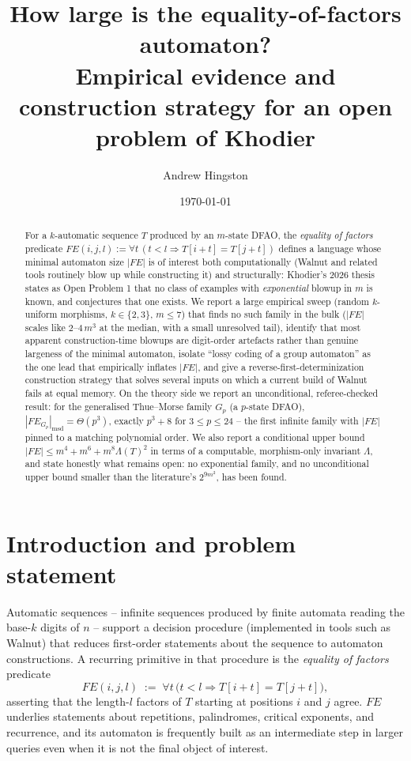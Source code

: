 \documentclass[11pt]{article}
\title{How large is the equality-of-factors automaton?\\
Empirical evidence and construction strategy for an open problem of Khodier}
\author{Andrew Hingston}
\date{\today}
\begin{document}
\maketitle

\begin{abstract}
For a $k$-automatic sequence $T$ produced by an $m$-state DFAO, the \emph{equality of
factors} predicate $FE(i,j,l) := \forall t\,(t<l \Rightarrow T[i+t]=T[j+t])$ defines a
language whose minimal automaton size $|FE|$ is of interest both computationally (Walnut
and related tools routinely blow up while constructing it) and structurally: Khodier's
2026 thesis states as Open Problem 1 that no class of examples with \emph{exponential}
blowup in $m$ is known, and conjectures that one exists. We report a large empirical
sweep (random $k$-uniform morphisms, $k\in\{2,3\}$, $m\le7$) that finds no such family in
the bulk ($|FE|$ scales like $2$--$4\,m^3$ at the median, with a small unresolved tail),
identify that most apparent construction-time blowups are digit-order artefacts rather
than genuine largeness of the minimal automaton, isolate ``lossy coding of a group
automaton'' as the one lead that empirically inflates $|FE|$, and give a
reverse-first-determinization construction strategy that solves several inputs on which a
current build of Walnut fails at equal memory. On the theory side we report an
unconditional, referee-checked result: for the generalised Thue--Morse family $G_p$ (a
$p$-state DFAO), $|FE_{G_p}|_{\mathrm{msd}}=\Theta(p^3)$, exactly $p^3+8$ for
$3\le p\le24$ -- the first infinite family with $|FE|$ pinned to a matching polynomial
order. We also report a conditional upper bound
$|FE|\le m^4+m^6+m^8\Lambda(T)^2$ in terms of a computable, morphism-only invariant
$\Lambda$, and state honestly what remains open: no exponential family, and no
unconditional upper bound smaller than the literature's $2^{9m^2}$, has been found.
\end{abstract}

\tableofcontents

\section{Introduction and problem statement}

Automatic sequences -- infinite sequences produced by finite automata reading the
base-$k$ digits of $n$ -- support a decision procedure (implemented in tools such as
Walnut) that reduces first-order statements about the sequence to automaton
constructions. A recurring primitive in that procedure is the \emph{equality of
factors} predicate
\[
FE(i,j,l) \;:=\; \forall t\,\big(t<l \Rightarrow T[i+t]=T[j+t]\big),
\]
asserting that the length-$l$ factors of $T$ starting at positions $i$ and $j$ agree.
$FE$ underlies statements about repetitions, palindromes, critical exponents, and
recurrence, and its automaton is frequently built as an intermediate step in larger
queries even when it is not the final object of interest.
\end{document}
